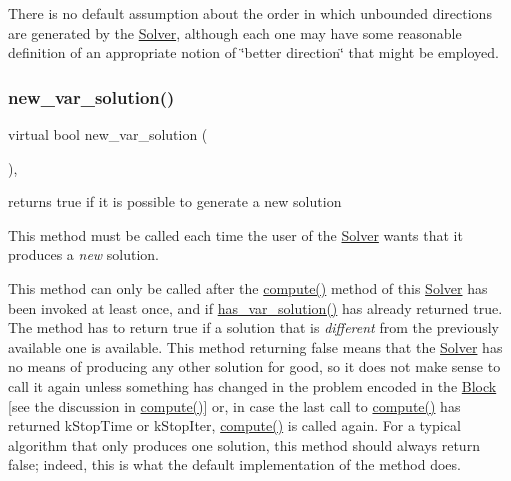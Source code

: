 There is no default assumption about the order in which unbounded directions are generated by the \mbox{\hyperlink{class_s_m_spp__di__unipi__it_1_1_solver}{Solver}}, although each one may have some reasonable definition of an appropriate notion of \char`\"{}better direction\char`\"{} that might be employed. \mbox{\label{class_s_m_spp__di__unipi__it_1_1_solver_af109b504a566c90a4ea45c1574c128fe}} 
\subsubsection{\texorpdfstring{new\+\_\+var\+\_\+solution()}{new\_var\_solution()}}
{\footnotesize\ttfamily virtual bool new\+\_\+var\+\_\+solution (\begin{DoxyParamCaption}\item[{void}]{ }\end{DoxyParamCaption})\hspace{0.3cm}{\ttfamily [inline]}, {\ttfamily [virtual]}}



returns true if it is possible to generate a new solution 

This method must be called each time the user of the \mbox{\hyperlink{class_s_m_spp__di__unipi__it_1_1_solver}{Solver}} wants that it produces a {\itshape new} solution.

This method can only be called after the \mbox{\hyperlink{class_s_m_spp__di__unipi__it_1_1_solver_a504d4e3e174c7a518cc66156a8a45ce5}{compute()}} method of this \mbox{\hyperlink{class_s_m_spp__di__unipi__it_1_1_solver}{Solver}} has been invoked at least once, and if \mbox{\hyperlink{class_s_m_spp__di__unipi__it_1_1_solver_aa96263f4e0c59225f3f5d54f03fe31ee}{has\+\_\+var\+\_\+solution()}} has already returned true. The method has to return true if a solution that is {\itshape different} from the previously available one is available. This method returning false means that the \mbox{\hyperlink{class_s_m_spp__di__unipi__it_1_1_solver}{Solver}} has no means of producing any other solution for good, so it does not make sense to call it again unless something has changed in the problem encoded in the \mbox{\hyperlink{class_s_m_spp__di__unipi__it_1_1_block}{Block}} \mbox{[}see the discussion in \mbox{\hyperlink{class_s_m_spp__di__unipi__it_1_1_solver_a504d4e3e174c7a518cc66156a8a45ce5}{compute()}}\mbox{]} or, in case the last call to \mbox{\hyperlink{class_s_m_spp__di__unipi__it_1_1_solver_a504d4e3e174c7a518cc66156a8a45ce5}{compute()}} has returned k\+Stop\+Time or k\+Stop\+Iter, \mbox{\hyperlink{class_s_m_spp__di__unipi__it_1_1_solver_a504d4e3e174c7a518cc66156a8a45ce5}{compute()}} is called again. For a typical algorithm that only produces one solution, this method should always return false; indeed, this is what the default implementation of the method does.

